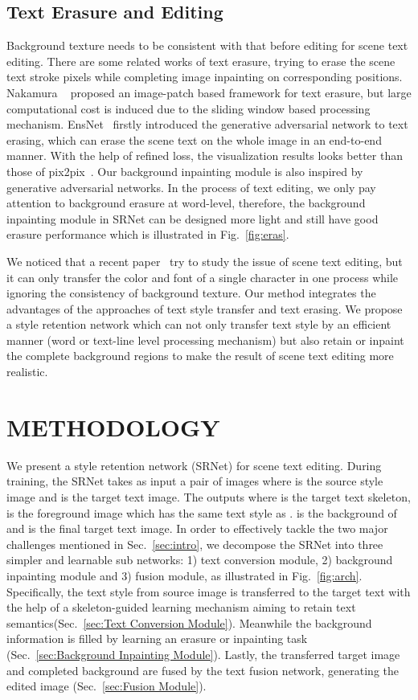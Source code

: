 \documentclass[sigconf]{acmart}
\begin{document}
\subsection{Text Erasure and Editing}
Background texture needs to be consistent with that before editing for scene text editing. There are some related works of text erasure, trying to erase the scene text stroke pixels while completing image inpainting on corresponding positions. Nakamura  ~\cite{nakamura2017scene} proposed an image-patch based framework for text erasure, but large computational cost is induced due to the sliding window based processing mechanism. EnsNet~\cite{zhang2019EnsNet} firstly introduced the generative adversarial network to text erasing, which can erase the scene text on the whole image in an end-to-end manner. With the help of refined loss, the visualization results looks better than those of pix2pix~\cite{isola2017image}. Our background inpainting module is also inspired by generative adversarial networks. In the process of text editing, we only pay attention to background erasure at word-level, therefore, the background inpainting module in SRNet can be designed more light and still have good erasure performance which is illustrated in Fig.~\ref{fig:eras}.

We noticed that a recent paper~\cite{roy2019stefann} try to study the issue of scene text editing, but it can only transfer the color and font of a single character in one process while ignoring the consistency of background texture. Our method integrates the advantages of the approaches of text style transfer and text erasing. We propose a style retention network which can not only transfer text style by an efficient manner (word or text-line level processing mechanism) but also retain or inpaint the complete background regions to make the result of scene text editing more realistic.


\section{METHODOLOGY}

We present a style retention network (SRNet) for scene text editing. During training, the SRNet takes as input a pair of images  where  is the source style image and  is the target text image. The outputs  where  is the target text skeleton,  is the foreground image which has the same text style as .  is the background of  and  is the final target text image.
In order to effectively tackle the two major challenges mentioned in Sec.~\ref{sec:intro}, we decompose the SRNet into three simpler and learnable sub networks: 1) text conversion module, 2) background inpainting module and 3) fusion module, as illustrated in Fig.~\ref{fig:arch}. Specifically, the text style from source image  is transferred to the target text with the help of a skeleton-guided learning mechanism aiming to retain text semantics(Sec.~\ref{sec:Text Conversion Module}). Meanwhile the background information is filled by learning an erasure or inpainting task (Sec.~\ref{sec:Background Inpainting Module}). Lastly, the transferred target image and completed background are fused by the text fusion network, generating the edited image (Sec.~\ref{sec:Fusion Module}).
\end{document}

